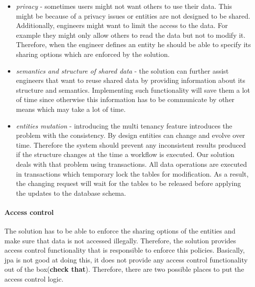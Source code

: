 \documentclass[a4paper, notitlepage]{article}
\begin{document}
\begin{itemize}

	\item \textit{privacy} - sometimes users might not want others to use their data. This might be because of a privacy issues or entities are not designed to be shared. Additionally, engineers might want to limit the access to the data. For example they might only allow others to read the data but not to modify it. Therefore, when the engineer defines an entity he should be able to specify its sharing options which are enforced by the solution.
	 
	\item \textit{semantics and structure of shared data} - the solution can further assist engineers that want to reuse shared data by providing information about its structure and semantics. Implementing such functionality will save them a lot of time since otherwise this information has to be communicate by other means which may take a lot of time.
	
	\item \textit{entities mutation} - introducing the multi tenancy feature introduces the problem with the consistency. By design entities can change and evolve over time. Therefore the system should prevent any inconsistent results produced if the structure changes at the time a workflow is executed. Our solution deals with that problem using transactions. All data operations are executed in transactions which temporary lock the tables for modification. As a result, the changing request will wait for the tables to be released before applying the updates to the database schema.
\end{itemize}


\paragraph{Access control}

The solution has to be able to enforce the sharing options of the entities and make sure that data is not accessed illegally. Therefore, the solution provides access control functionality that is responsible to enforce this policies. Basically, jpa is not good at doing this, it does not provide any access control functionality out of the box(\textbf{check that}). Therefore, there are two possible places to put the access control logic. 
\end{document}
